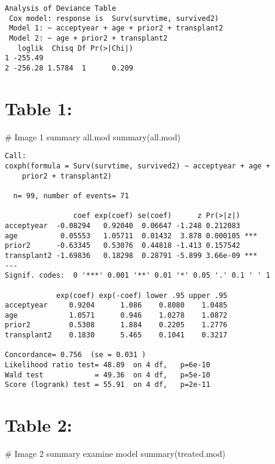 \documentclass[
  letterpaper,
  DIV=11,
  numbers=noendperiod]{scrreprt}
\newenvironment{Shaded}{\begin{snugshade}}{\end{snugshade}}
\newcommand{\CommentTok}[1]{\textcolor[rgb]{0.37,0.37,0.37}{#1}}
\newcommand{\FunctionTok}[1]{\textcolor[rgb]{0.28,0.35,0.67}{#1}}
\newcommand{\NormalTok}[1]{\textcolor[rgb]{0.00,0.23,0.31}{#1}}
\begin{document}
\begin{verbatim}
Analysis of Deviance Table
 Cox model: response is  Surv(survtime, survived2)
 Model 1: ~ acceptyear + age + prior2 + transplant2
 Model 2: ~ age + prior2 + transplant2
   loglik  Chisq Df Pr(>|Chi|)
1 -255.49                     
2 -256.28 1.5784  1      0.209
\end{verbatim}

\hypertarget{table-1}{%
\section{\texorpdfstring{Table \textbf{1:}}{Table 1:}}\label{table-1}}

\begin{Shaded}
\begin{Highlighting}[]
\CommentTok{\# Image 1 summary all.mod}
\FunctionTok{summary}\NormalTok{(all.mod)}
\end{Highlighting}
\end{Shaded}

\begin{verbatim}
Call:
coxph(formula = Surv(survtime, survived2) ~ acceptyear + age + 
    prior2 + transplant2)

  n= 99, number of events= 71 

                coef exp(coef) se(coef)      z Pr(>|z|)    
acceptyear  -0.08294   0.92040  0.06647 -1.248 0.212083    
age          0.05553   1.05711  0.01432  3.878 0.000105 ***
prior2      -0.63345   0.53076  0.44818 -1.413 0.157542    
transplant2 -1.69836   0.18298  0.28791 -5.899 3.66e-09 ***
---
Signif. codes:  0 '***' 0.001 '**' 0.01 '*' 0.05 '.' 0.1 ' ' 1

            exp(coef) exp(-coef) lower .95 upper .95
acceptyear     0.9204      1.086    0.8080    1.0485
age            1.0571      0.946    1.0278    1.0872
prior2         0.5308      1.884    0.2205    1.2776
transplant2    0.1830      5.465    0.1041    0.3217

Concordance= 0.756  (se = 0.031 )
Likelihood ratio test= 48.89  on 4 df,   p=6e-10
Wald test            = 49.36  on 4 df,   p=5e-10
Score (logrank) test = 55.91  on 4 df,   p=2e-11
\end{verbatim}

\hypertarget{table-2}{%
\section{Table 2:}\label{table-2}}

\begin{Shaded}
\begin{Highlighting}[]
\CommentTok{\# Image 2 summary examine model}
\FunctionTok{summary}\NormalTok{(treated.mod)}
\end{Highlighting}
\end{Shaded}
\end{document}
